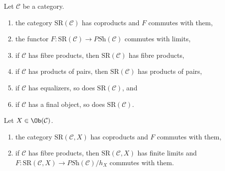 \begin{lemma}
\label{lemma-coprod-prod-SR}
Let $\mathcal{C}$ be a category.
\begin{enumerate}
\item the category $\text{SR}(\mathcal{C})$ has coproducts
and $F$ commutes with them,
\item the functor $F : \text{SR}(\mathcal{C}) \to \textit{PSh}(\mathcal{C})$
commutes with limits,
\item if $\mathcal{C}$ has fibre products, then $\text{SR}(\mathcal{C})$
has fibre products,
\item if $\mathcal{C}$ has products of pairs, then
$\text{SR}(\mathcal{C})$ has products of pairs,
\item if $\mathcal{C}$ has equalizers, so does $\text{SR}(\mathcal{C})$, and
\item if $\mathcal{C}$ has a final object, so does $\text{SR}(\mathcal{C})$.
\end{enumerate}
Let $X \in \Ob(\mathcal{C})$.
\begin{enumerate}
\item the category $\text{SR}(\mathcal{C}, X)$ has coproducts
and $F$ commutes with them,
\item if $\mathcal{C}$ has fibre products, then $\text{SR}(\mathcal{C}, X)$
has finite limits and
$F : \text{SR}(\mathcal{C}, X) \to \textit{PSh}(\mathcal{C})/h_X$
commutes with them.
\end{enumerate}
\end{lemma}

